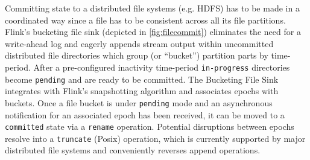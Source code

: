  Committing state to a distributed file systems (e.g. HDFS) has to be made in a coordinated way since a file has to be consistent across all its file partitions. Flink's bucketing file sink (depicted in \autoref{fig:filecommit}) eliminates the need for a write-ahead log and eagerly appends stream output within uncommitted distributed file directories which group (or ``bucket'') partition parts by time-period. After a pre-configured inactivity time-period \texttt{in-progress} directories become \texttt{pending} and are ready to be committed. The Bucketing File Sink integrates with Flink's snapshotting algorithm and associates epochs with buckets. Once a file bucket is under \texttt{pending} mode and an asynchronous notification for an associated epoch has been received, it can be moved to a \texttt{committed} state via a \texttt{rename} operation. Potential disruptions between epochs resolve into a \texttt{truncate} (Posix) operation, which is currently supported by major distributed file systems and conveniently reverses append operations. 



